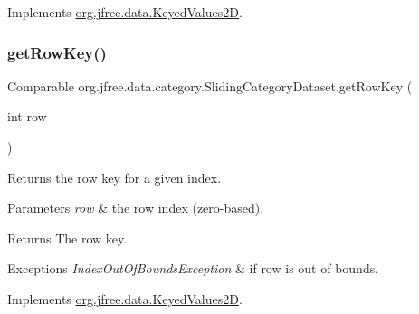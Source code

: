 Implements \mbox{\hyperlink{interfaceorg_1_1jfree_1_1data_1_1_keyed_values2_d_ae92ded12999f2872687a5754ddf29254}{org.\+jfree.\+data.\+Keyed\+Values2D}}.

\mbox{\label{classorg_1_1jfree_1_1data_1_1category_1_1_sliding_category_dataset_a6fcf1e054f8df00a8d37ea3b6eb0960a}} 
\subsubsection{\texorpdfstring{get\+Row\+Key()}{getRowKey()}}
{\footnotesize\ttfamily Comparable org.\+jfree.\+data.\+category.\+Sliding\+Category\+Dataset.\+get\+Row\+Key (\begin{DoxyParamCaption}\item[{int}]{row }\end{DoxyParamCaption})}

Returns the row key for a given index.


\begin{DoxyParams}{Parameters}
{\em row} & the row index (zero-\/based).\\
\hline
\end{DoxyParams}
\begin{DoxyReturn}{Returns}
The row key.
\end{DoxyReturn}

\begin{DoxyExceptions}{Exceptions}
{\em Index\+Out\+Of\+Bounds\+Exception} & if {\ttfamily row} is out of bounds. \\
\hline
\end{DoxyExceptions}


Implements \mbox{\hyperlink{interfaceorg_1_1jfree_1_1data_1_1_keyed_values2_d_a7c145e2383036a479460e4bca7b40a95}{org.\+jfree.\+data.\+Keyed\+Values2D}}.

\mbox{\label{classorg_1_1jfree_1_1data_1_1category_1_1_sliding_category_dataset_afac3ef11a6f20fcbae0b573ce8d9562e}} 
